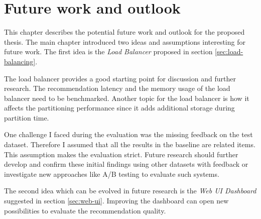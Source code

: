 \chapter{Future work and outlook}
\label{chap:future-work}
This chapter describes the potential future work and outlook for the proposed thesis. The main chapter introduced two ideas and assumptions interesting for future work. The first idea is the \emph{Load Balancer} proposed in section \ref{sec:load-balancing}. 


The load balancer provides a good starting point for discussion and further research. The recommendation latency and the memory usage of the load balancer need to be benchmarked. Another topic for the load balancer is how it affects the partitioning performance since it adds additional storage during partition time. 


One challenge I faced during the evaluation was the missing feedback on the test dataset. Therefore I assumed that all the results in the baseline are related items. This assumption makes the evaluation strict. Future research should further develop and confirm these initial findings using other datasets with feedback or investigate new approaches like A/B testing to evaluate such systems.


The second idea which can be evolved in future research is the \emph{Web UI Dashboard} suggested in section \ref{sec:web-ui}. Improving the dashboard can open new possibilities to evaluate the recommendation quality. 



